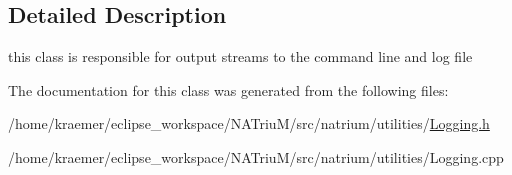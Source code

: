 \subsection{Detailed Description}
this class is responsible for output streams to the command line and log file 

The documentation for this class was generated from the following files\-:\begin{DoxyCompactItemize}
\item 
/home/kraemer/eclipse\-\_\-workspace/\-N\-A\-Triu\-M/src/natrium/utilities/\hyperlink{Logging_8h}{Logging.\-h}\item 
/home/kraemer/eclipse\-\_\-workspace/\-N\-A\-Triu\-M/src/natrium/utilities/Logging.\-cpp\end{DoxyCompactItemize}
